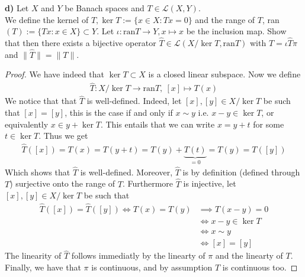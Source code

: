 \documentclass[12pt,a4paper]{article}
\theoremstyle{definition}
\begin{document}
\noindent \textbf{d)} Let $X$ and $Y$ be Banach spaces and $T \in \mathcal{L}(X,Y)$. \\ We define the kernel of $T, \ker T := \lbrace x \in X : Tx = 0 \rbrace$ and the range of $T$, ran$(T):= \lbrace Tx: x \in X \rbrace \subset Y$. Let $\iota : \text{ran}T \to Y , x \mapsto x$ be the inclusion map. Show that then there exists a bijective operator $\hat{T} \in \mathcal{L}(X/ \ker T, \text{ran}T)$ with $T = \iota \hat{T} \pi$ and $\| \hat{T} \| = \|T \|$. 
\begin{proof}
We have indeed that $\ker T \subset X$ is a closed linear subspace. Now we define 
\begin{align*}
\hat{T}: X/\ker T \to \text{ran}T, \  [x] \mapsto T(x)
\end{align*}
We notice that that $\hat{T}$ is well-defined. Indeed, let $[x], [y] \in X/ \ker T$ be such that $[x]=[y]$, this is the case if and only if $x \sim y$ i.e. $x-y \in \ker T$, or equivalently $x \in y + \ker T$. This entails that we can write $x= y + t$ for some $t \in \ker T$. Thus we get
\begin{align*}
\hat{T}([x])=T(x)= T(y+t)=T(y)+\underbrace{T(t)}_{=0} = T(y)=T([y])
\end{align*}
Which shows that $\hat{T}$ is well-defined. Moreover, $\hat{T}$ is by definition (defined through $T$) surjective onto the range of $T$. Furthermore $\hat{T}$ is injective, let $[x],[y] \in X/\ker T$ be such that 
\begin{align*}
\hat{T}([x])=\hat{T}([y]) \iff T(x)=T(y)& \implies T(x-y)=0 \\
 &\iff x-y \in \ker T \\
 & \iff x \sim y \\
 & \iff [x]=[y]
\end{align*} 
The linearity of $\hat{T}$ follows immediatly by the linearty of $\pi$ and the linearty of $T$. Finally, we have that $\pi$ is continuous, and by assumption $T$ is continuous too. 


\end{proof}
\end{document}
